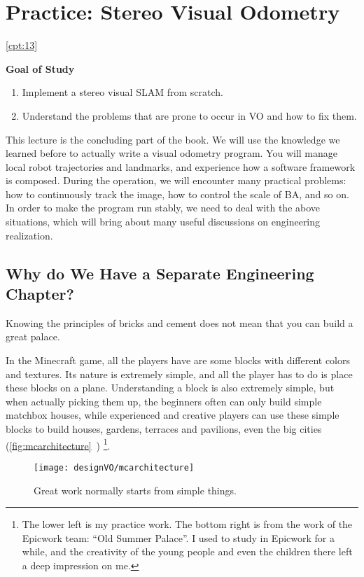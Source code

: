 \chapter{Practice: Stereo Visual Odometry}
\ref{cpt:13}
\begin{mdframed}  
	\textbf{Goal of Study}
	\begin{enumerate}[labelindent=0em,leftmargin=1.5em]
	\item Implement a stereo visual SLAM from scratch.
	\item Understand the problems that are prone to occur in VO and how to fix them.
	\end{enumerate}
\end{mdframed}

This lecture is the concluding part of the book. We will use the knowledge we learned before to actually write a visual odometry program. You will manage local robot trajectories and landmarks, and experience how a software framework is composed. During the operation, we will encounter many practical problems: how to continuously track the image, how to control the scale of BA, and so on. In order to make the program run stably, we need to deal with the above situations, which will bring about many useful discussions on engineering realization.

\newpage
\section{Why do We Have a Separate Engineering Chapter?}
Knowing the principles of bricks and cement does not mean that you can build a great palace.

In the Minecraft game, all the players have are some blocks with different colors and textures. Its nature is extremely simple, and all the player has to do is place these blocks on a plane. Understanding a block is also extremely simple, but when actually picking them up, the beginners often can only build simple matchbox houses, while experienced and creative players can use these simple blocks to build houses, gardens, terraces and pavilions, even the big cities (\autoref{fig:mcarchitecture}~) \footnote{The lower left is my practice work. The bottom right is from the work of the Epicwork team: ``Old Summer Palace''. I used to study in Epicwork for a while, and the creativity of the young people and even the children there left a deep impression on me. }.

\begin{figure}[!htp]
	\centering    
	\texttt{[image: designVO/mcarchitecture]}\\
	\caption{Great work normally starts from simple things.}
	\label{fig:mcarchitecture}
\end{figure}

